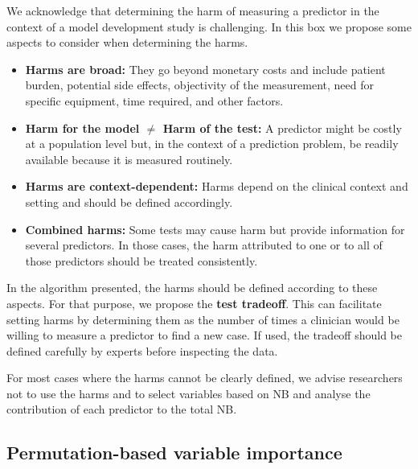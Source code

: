 \begin{tcolorbox}[title={Box 1: Harm of a test and test tradeoff}, label={box:harm}]
We acknowledge that determining the harm of measuring a predictor in the context of a model development study is challenging. In this box we propose some aspects to consider when determining the harms.

\begin{itemize}
    \item \textbf{Harms are broad:} They go beyond monetary costs and include patient burden, potential side effects, objectivity of the measurement, need for specific equipment, time required, and other factors.
    \item \textbf{Harm for the model $\neq$ Harm of the test:} A predictor might be costly at a population level but, in the context of a prediction problem, be readily available because it is measured routinely.
    \item \textbf{Harms are context-dependent:} Harms depend on the clinical context and setting and should be defined accordingly.
    \item \textbf{Combined harms:} Some tests may cause harm but provide information for several predictors. In those cases, the harm attributed to one or to all of those predictors should be treated consistently.
\end{itemize}

In the algorithm presented, the harms should be defined according to these aspects. For that purpose, we propose the \textbf{test tradeoff}. This can facilitate setting harms by determining them as the number of times a clinician would be willing to measure a predictor to find a new case. If used, the tradeoff should be defined carefully by experts before inspecting the data.

For most cases where the harms cannot be clearly defined, we advise researchers not to use the harms and to select variables based on \gls{NB} and analyse the contribution of each predictor to the total \gls{NB}.
\end{tcolorbox}

\subsection{Permutation-based variable importance}

